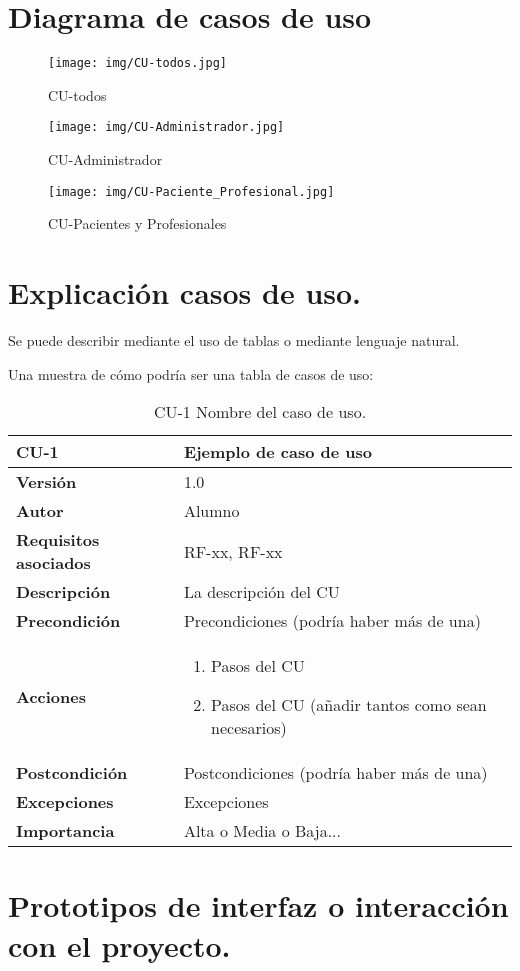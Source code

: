 \section{Diagrama de casos de uso}


\begin{figure}[h]
    \centering
    \texttt{[image: img/CU-todos.jpg]}
    \caption{CU-todos}
    \label{fig:CU-todos}
\end{figure}

\begin{figure}[h]
    \centering
    \texttt{[image: img/CU-Administrador.jpg]}
    \caption{CU-Administrador}
    \label{fig:CU-Administrador}
\end{figure}

\begin{figure}[h]
    \centering
    \texttt{[image: img/CU-Paciente\_Profesional.jpg]}
    \caption{CU-Pacientes y Profesionales}
    \label{fig:CU-Paciente_Profesional}
\end{figure}




\section{Explicación casos de uso.}

Se puede describir mediante el uso de tablas o mediante lenguaje natural.    

Una muestra de cómo podría ser una tabla de casos de uso:

\begin{table}[p]
	\centering
	\begin{tabularx}{\linewidth}{ p{} p{} }
		\toprule
		\textbf{CU-1}    & \textbf{Ejemplo de caso de uso}\\
		\toprule
		\textbf{Versión}              & 1.0    \\
		\textbf{Autor}                & Alumno \\
		\textbf{Requisitos asociados} & RF-xx, RF-xx \\
		\textbf{Descripción}          & La descripción del CU \\
		\textbf{Precondición}         & Precondiciones (podría haber más de una) \\
		\textbf{Acciones}             &
		\begin{enumerate}
			\def\labelenumi{\arabic{enumi}.}
			\tightlist
			\item Pasos del CU
			\item Pasos del CU (añadir tantos como sean necesarios)
		\end{enumerate}\\
		\textbf{Postcondición}        & Postcondiciones (podría haber más de una) \\
		\textbf{Excepciones}          & Excepciones \\
		\textbf{Importancia}          & Alta o Media o Baja... \\
		\bottomrule
	\end{tabularx}
	\caption{CU-1 Nombre del caso de uso.}
\end{table}

\section{Prototipos de interfaz o interacción con el proyecto.}


